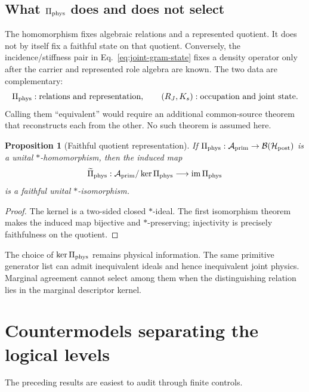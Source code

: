 \documentclass[11pt]{article}
\newtheorem{proposition}{Proposition}
\newcommand{\Aprim}{\mathcal A_{\rm prim}}
\begin{document}
\subsection{What \(\Pi_{\rm phys}\) does and does not select}

The homomorphism fixes algebraic relations and a represented quotient.  It does
not by itself fix a faithful state on that quotient.  Conversely, the
incidence/stiffness pair in Eq.~\eqref{eq:joint-gram-state} fixes a density
operator only after the carrier and represented role algebra are known.  The
two data are complementary:
\begin{equation}
 \Pi_{\rm phys}:
 \text{relations and representation},
 \qquad
 (R_J,K_s):
 \text{occupation and joint state}.
 \label{eq:representation-state-split}
\end{equation}
Calling them ``equivalent'' would require an additional common-source theorem
that reconstructs each from the other.  No such theorem is assumed here.

\begin{proposition}[Faithful quotient representation]
If \(\Pi_{\rm phys}:\Aprim\to\mathcal B(\mathcal H_{\rm post})\) is a unital
\(*\)-homomorphism, then the induced map
\begin{equation}
 \widetilde\Pi_{\rm phys}:
 \Aprim/\ker\Pi_{\rm phys}\longrightarrow
 \operatorname{im}\Pi_{\rm phys}
 \label{eq:faithful-quotient-map}
\end{equation}
is a faithful unital \(*\)-isomorphism.
\end{proposition}
\begin{proof}
The kernel is a two-sided closed \(*\)-ideal.  The first isomorphism theorem
makes the induced map bijective and \(*\)-preserving; injectivity is precisely
faithfulness on the quotient.
\end{proof}

The choice of \(\ker\Pi_{\rm phys}\) remains physical information.  The same
primitive generator list can admit inequivalent ideals and hence inequivalent
joint physics.  Marginal agreement cannot select among them when the
distinguishing relation lies in the marginal descriptor kernel.

\section{Countermodels separating the logical levels}

The preceding results are easiest to audit through finite controls.
\end{document}
